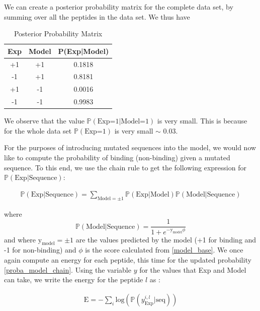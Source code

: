 \documentclass[a4paper, 12pt]{article}
\begin{document}
We can create a posterior probability matrix for the complete data set, by summing over all the peptides in the data set. We thus have

\begin{table}[!h]
\centering
\label{tab_proba_posterior}
\caption{Posterior Probability Matrix}
\begin{tabular}{@{}ccc@{}}
\toprule
Exp & Model & P(Exp|Model) \\ \midrule
+1  & +1    & 0.1818       \\
-1  & +1    & 0.8181       \\
+1  & -1    & 0.0016       \\
-1  & -1    & 0.9983       \\ \bottomrule

\end{tabular}
\end{table}

We observe that the value $\mathbb{P}(\text{Exp=1|Model=1})$ is very small. This is because for the whole data set $\mathbb{P}(\text{Exp=1})$ is very small $\sim$ 0.03. 

For the purposes of introducing mutated sequences into the model, we would now like to compute the probability of binding (non-binding) given a mutated sequence. To this end, we use the chain rule to get the following expression for $\mathbb{P}(\text{Exp|Sequence})$:

\begin{align}
\label{proba_model_chain}
\mathbb{P}(\text{Exp|Sequence}) = \sum_{\text{Model}=\pm 1} \mathbb{P}(\text{Exp|Model}) \mathbb{P}(\text{Model|Sequence})
\end{align}

where 
\begin{equation}
\mathbb{P}(\text{Model|Sequence}) = \frac{1}{1+e^{-\textrm{y}_{\text{model}} \phi}}
\end{equation}
and where $\textrm{y}_{\text{model}} = \pm 1$ are the values predicted by the model (+1 for binding and -1 for non-binding) and $\phi$  is the score calculated from \eqref{model_base}. We once again compute an energy for each peptide, this time for the updated probability \eqref{proba_model_chain}. Using the variable $y$ for the values that Exp and Model can take, we write the energy for the peptide $l$ as :

\begin{align} 
\label{energy_bayes}
\mathrm{E} = - \sum_{i} \mathrm{log}(\mathbb{P}(y^{i,l}_{\text{Exp}} | \text{seq}))
\end{align}
\end{document}
